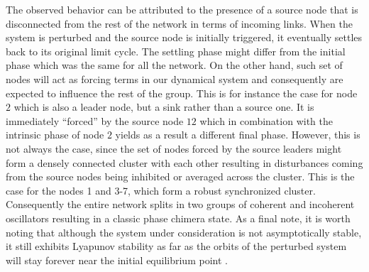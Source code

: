 \documentclass[prx,twocolumn,amsmath,noshowkeys,noshowpacs,amssymb]{revtex4-2}
\begin{document}
The observed behavior can be attributed to the presence of a source node that is disconnected from the rest of the network in terms of incoming links. When the system is perturbed and the source node is initially triggered, it eventually settles back to its original limit cycle. The settling phase might differ from the initial phase which was the same for all the network. On the other hand, such set of nodes will act as forcing terms in our dynamical system and consequently are expected to influence the rest of the group. This is for instance the case for node $2$ which is also a leader node, but a sink rather than a source one. It is immediately ``forced'' by the source node $12$ which in combination with the intrinsic phase of node $2$ yields as a result a different final phase. However, this is not always the case, since the set of nodes forced by the source leaders might form a densely connected cluster with each other resulting in disturbances coming from the source nodes being inhibited or averaged across the cluster. This is the case for the nodes 1 and 3-7, which form a robust synchronized cluster. Consequently the entire network splits in two groups of coherent and incoherent oscillators resulting in a classic phase chimera state. As a final note, it is worth noting that although the system under consideration is not asymptotically stable, it still exhibits Lyapunov stability as far as the orbits of the perturbed system will stay forever near the initial equilibrium point \cite{strogatz_book}. 
\end{document}
